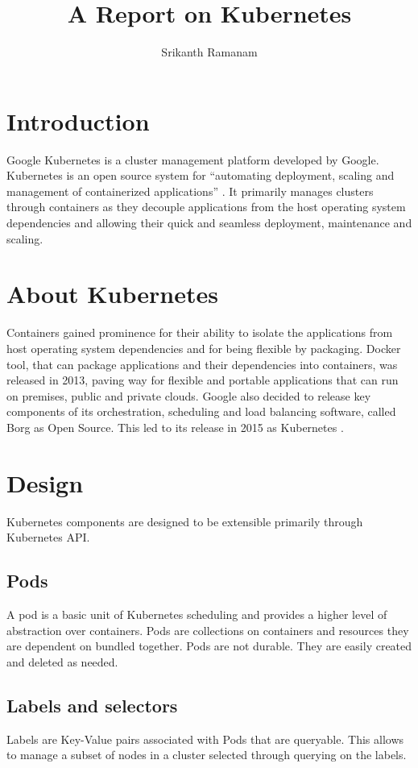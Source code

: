 \documentclass[9pt,twocolumn,twoside]{../../styles/osajnl}
\title{A Report on Kubernetes}
\author[1]{Srikanth Ramanam}
\affil[1]{School of Informatics and Computing, Bloomington, IN 47408, U.S.A.}
\affil[*]{Corresponding authors: srikrama@iu.edu}
\begin{document}
\maketitle

\section{Introduction}
Google Kubernetes is a cluster management platform developed by Google. Kubernetes is an open source system for “automating deployment, scaling and management of containerized applications” \cite{www-kubernetesdoc}. It primarily manages clusters through containers as they decouple applications from the host operating system dependencies and allowing their quick and seamless deployment, maintenance and scaling.




\section{About Kubernetes}

Containers gained prominence for their ability to isolate the applications from host operating system dependencies and for being flexible by packaging. Docker tool, that can package applications and their dependencies into containers, was released in 2013, paving way for flexible and portable applications that can run on premises, public and private clouds. Google also decided to release key components of its orchestration, scheduling and load balancing software, called Borg as Open Source. This led to its release in 2015 as Kubernetes \cite{www-kubernetesebook}.



\section{Design}
Kubernetes components are designed to be extensible primarily through Kubernetes API. 
\subsection{Pods}
A pod is a basic unit of Kubernetes scheduling and provides a higher level of abstraction over containers. Pods are collections on containers and resources they are dependent on bundled together. Pods are not durable. They are easily created and deleted as needed.
\subsection{Labels and selectors}
Labels are Key-Value pairs associated with Pods that are queryable. This allows to manage a subset of nodes in a cluster selected through querying on the labels.
\end{document}

